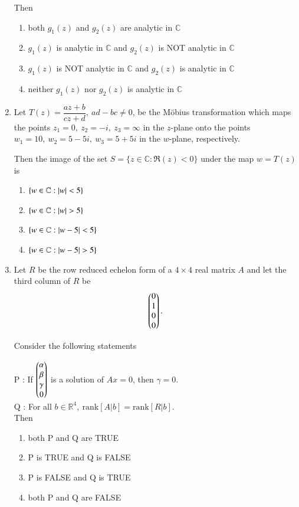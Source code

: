 \documentclass[journal,12pt,onecolumn]{IEEEtran}
\theoremstyle{remark}
\begin{document}
\begin{enumerate}[start=1, label=Q.\arabic*]
Then
\begin{enumerate}
\item both $g_1(z)$ and $g_2(z)$ are analytic in $\mathbb{C}$
\item $g_1(z)$ is analytic in $\mathbb{C}$ and $g_2(z)$ is NOT analytic in $\mathbb{C}$
\item $g_1(z)$ is NOT analytic in $\mathbb{C}$ and $g_2(z)$ is analytic in $\mathbb{C}$
\item neither $g_1(z)$ nor $g_2(z)$ is analytic in $\mathbb{C}$
\end{enumerate}

\hfill{}


\item Let $T(z)=\dfrac{az+b}{cz+d},\ ad-bc \ne 0$, be the Möbius transformation which maps the points $z_1=0,\ z_2=-i,\ z_3=\infty$ in the $z$\mbox{-}plane onto the points $w_1=10,\ w_2=5-5i,\ w_3=5+5i$ in the $w$\mbox{-}plane, respectively.  

Then the image of the set $S=\{z \in \mathbb{C} : \Re(z)<0\}$ under the map $w=T(z)$ is
\begin{enumerate}
\item $\{w \in \mathbb{C} : \left\vert w\right\vert<5\}$
\item $\{w \in \mathbb{C} : \left\vert w\right\vert>5\}$
\item $\{w \in \mathbb{C} : \left\vert w-5\right\vert<5\}$
\item $\{w \in \mathbb{C} : \left\vert w-5\right\vert>5\}$
\end{enumerate}

\hfill{}
\item Let $R$ be the row reduced echelon form of a $4 \times 4$ real matrix $A$ and let the third column of $R$ be 
\[
\begin{pmatrix}0 \\ 1 \\ 0 \\ 0\end{pmatrix}.
\]  

Consider the following statements\brak{:}

P : If $\begin{pmatrix}\alpha \\ \beta \\ \gamma \\ 0\end{pmatrix}$ is a solution of $Ax=0$, then $\gamma=0$.\\
Q : For all $b \in \mathbb{R}^{4},\ \text{rank}[A|b]=\text{rank}[R|b]$.\\

Then
\begin{enumerate}
\item both P and Q are TRUE
\item P is TRUE and Q is FALSE
\item P is FALSE and Q is TRUE
\item both P and Q are FALSE
\end{enumerate}


\end{enumerate}
\end{document}

